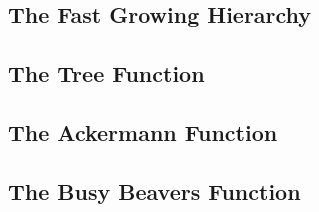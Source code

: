 \subsection{The Fast Growing Hierarchy}



\subsection{The Tree Function}

\subsection{The Ackermann Function}

\subsection{The Busy Beavers Function}







